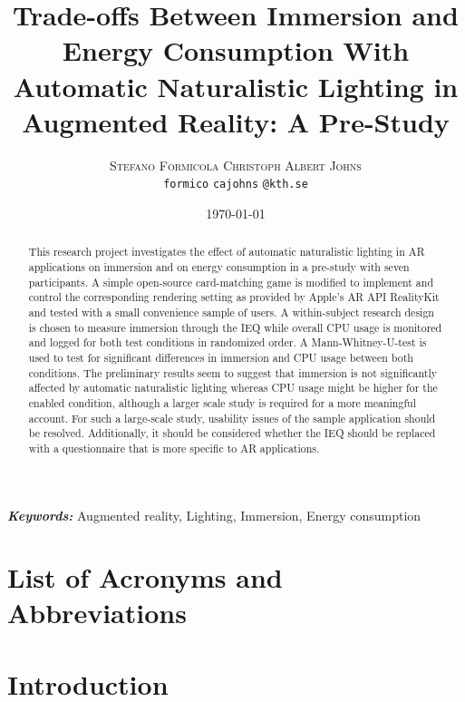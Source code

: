 \documentclass[12pt,twoside,english]{article}
\title{Trade-offs Between Immersion and Energy Consumption With Automatic Naturalistic Lighting in Augmented Reality: A Pre-Study}
\author{
        \textsc{Stefano Formicola}
            \qquad
        \textsc{Christoph Albert Johns}
        \mbox{}\\
        \normalsize
            \texttt{formico}
        \textbar{}
            \texttt{cajohns}
        \normalsize
            \texttt{@kth.se}
}
\date{\today}
\providecommand{\keywords}[1]
{
  \small	
  \textbf{\textit{Keywords:}} #1
}
\begin{document}
\maketitle


\begin{abstract}
\label{sec:abstract}

This research project investigates the effect of automatic naturalistic lighting in \gls{AR} applications on immersion and on energy consumption in a pre-study with seven participants.
A simple open-source card-matching game is modified to implement and control the corresponding rendering setting as provided by Apple's \gls{AR} \gls{API} RealityKit and tested with a small convenience sample of users.
A within-subject research design is chosen to measure immersion through the \gls{IEQ} while overall \gls{CPU} usage is monitored and logged for both test conditions in randomized order.
A Mann-Whitney-U-test is used to test for significant differences in immersion and \gls{CPU} usage between both conditions.
The preliminary results seem to suggest that immersion is not significantly affected by automatic naturalistic lighting whereas \gls{CPU} usage might be higher for the enabled condition, although a larger scale study is required for a more meaningful account.
For such a large-scale study, usability issues of the sample application should be resolved.
Additionally, it should be considered whether the \gls{IEQ} should be replaced with a questionnaire that is more specific to \gls{AR} applications.

\end{abstract}

\keywords{Augmented reality, Lighting, Immersion, Energy consumption}
\clearpage

\tableofcontents

\section*{List of Acronyms and Abbreviations}
\label{list-of-acronyms-and-abbreviations}
\renewcommand{\glossarysection}[2][]{} %
\printglossary[type=\acronymtype, nonumberlist]

\clearpage
\section{Introduction}
\label{sect:introduction}
\end{document}
